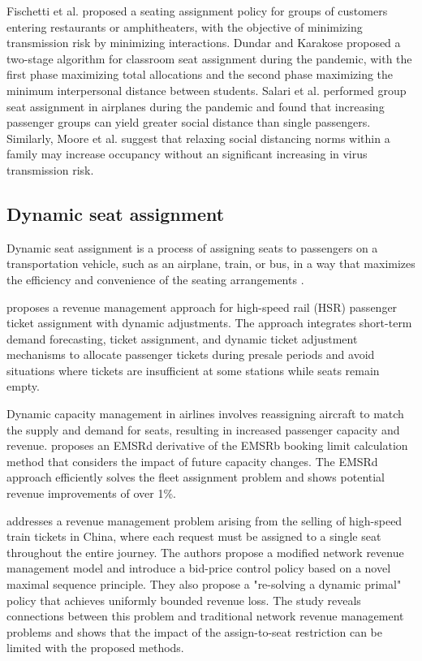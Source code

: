 Fischetti et al. \cite{fischetti2021safe} proposed a seating assignment policy for groups of customers entering restaurants or amphitheaters, with the objective of minimizing transmission risk by minimizing interactions. Dundar and Karakose \cite{dundar2021seat} proposed a two-stage algorithm for classroom seat assignment during the pandemic, with the first phase maximizing total allocations and the second phase maximizing the minimum interpersonal distance between students. Salari et al. \cite{salari2022social} performed group seat assignment in airplanes during the pandemic and found that increasing passenger groups can yield greater social distance than single passengers. Similarly, Moore et al. \cite{moore2021seat} suggest that relaxing social distancing norms within a family may increase occupancy without an significant increasing in virus transmission risk.




\subsection{Dynamic seat assignment}
Dynamic seat assignment is a process of assigning seats to passengers on a transportation vehicle, such as an airplane, train, or bus, in a way that maximizes the efficiency and convenience of the seating arrangements \cite{hamdouch2011schedule, berge1993demand}. 

\cite{jiang2015dynamic} proposes a revenue management approach for high-speed rail (HSR) passenger ticket assignment with dynamic adjustments. The approach integrates short-term demand forecasting, ticket assignment, and dynamic ticket adjustment mechanisms to allocate passenger tickets during presale periods and avoid situations where tickets are insufficient at some stations while seats remain empty.

Dynamic capacity management in airlines involves reassigning aircraft to match the supply and demand for seats, resulting in increased passenger capacity and revenue. \cite{de2004impact} proposes an EMSRd derivative of the EMSRb booking limit calculation method that considers the impact of future capacity changes. The EMSRd approach efficiently solves the fleet assignment problem and shows potential revenue improvements of over 1\%.

\cite{zhu2023assign} addresses a revenue management problem arising from the selling of high-speed train tickets in China, where each request must be assigned to a single seat throughout the entire journey. The authors propose a modified network revenue management model and introduce a bid-price control policy based on a novel maximal sequence principle. They also propose a "re-solving a dynamic primal" policy that achieves uniformly bounded revenue loss. The study reveals connections between this problem and traditional network revenue management problems and shows that the impact of the assign-to-seat restriction can be limited with the proposed methods.

